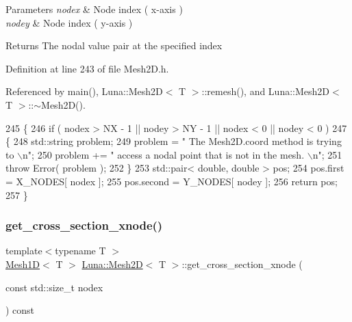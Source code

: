 \begin{DoxyParams}{Parameters}
{\em nodex} & Node index ( x-\/axis ) \\
\hline
{\em nodey} & Node index ( y-\/axis ) \\
\hline
\end{DoxyParams}
\begin{DoxyReturn}{Returns}
The nodal value pair at the specified index 
\end{DoxyReturn}


Definition at line 243 of file Mesh2\+D.\+h.



Referenced by main(), Luna\+::\+Mesh2\+D$<$ T $>$\+::remesh(), and Luna\+::\+Mesh2\+D$<$ T $>$\+::$\sim$\+Mesh2\+D().


\begin{DoxyCode}
245   \{
246     \textcolor{keywordflow}{if} ( nodex > NX - 1 || nodey > NY - 1 || nodex < 0 || nodey < 0 )
247     \{
248       std::string problem;
249       problem = \textcolor{stringliteral}{" The Mesh2D.coord method is trying to \(\backslash\)n"};
250       problem += \textcolor{stringliteral}{" access a nodal point that is not in the mesh. \(\backslash\)n"};
251       \textcolor{keywordflow}{throw} Error( problem );
252     \}
253     std::pair< double, double > pos;
254     pos.first = X\_NODES[ nodex ];
255     pos.second = Y\_NODES[ nodey ];
256     \textcolor{keywordflow}{return} pos;
257   \}
\end{DoxyCode}
\mbox{\label{classLuna_1_1Mesh2D_ac6745e18c235492110c0b6e3a9f94351}} 
\subsubsection{\texorpdfstring{get\+\_\+cross\+\_\+section\+\_\+xnode()}{get\_cross\_section\_xnode()}}
{\footnotesize\ttfamily template$<$typename T $>$ \\
\hyperlink{classLuna_1_1Mesh1D}{Mesh1D}$<$ T $>$ \hyperlink{classLuna_1_1Mesh2D}{Luna\+::\+Mesh2D}$<$ T $>$\+::get\+\_\+cross\+\_\+section\+\_\+xnode (\begin{DoxyParamCaption}\item[{const std\+::size\+\_\+t}]{nodex }\end{DoxyParamCaption}) const}



